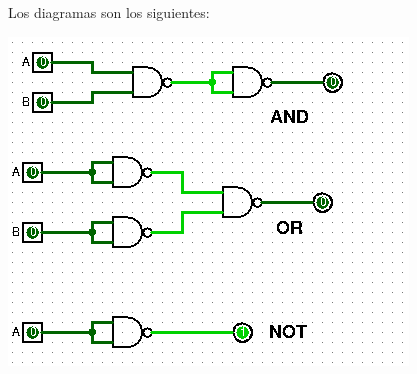 \documentclass[answers]{exam}
\begin{document}
\begin{questions}
  \begin{solution}
    Los diagramas son los siguientes:
    \begin{center}
      \includegraphics[scale=0.8]{ejercicio2}
    \end{center}
  \end{solution}

  \newpage{}


\end{questions}
\end{document}
